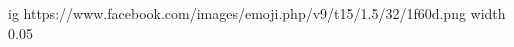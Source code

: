  
 
 
 
 
\ifcmt
  ig https://www.facebook.com/images/emoji.php/v9/t15/1.5/32/1f60d.png
  width 0.05
\fi
